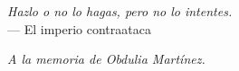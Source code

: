 \cleardoubleemptypage
\thispagestyle{empty}
{}

\vspace*{3cm}

\begin{flushright}
    \textit{Hazlo o no lo hagas, pero no lo intentes.} \\ \medskip
    --- El imperio contraataca
\end{flushright}


\medskip

\begin{flushright}
    \textit{A la memoria de Obdulia Mart\'inez.} \\ \smallskip
\end{flushright}